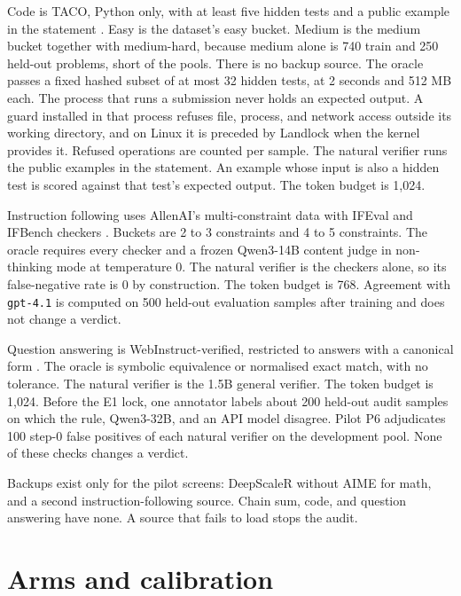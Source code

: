 Code is TACO, Python only, with at least five hidden tests and a public example in the statement \citep{li2023taco}.
Easy is the dataset's easy bucket.
Medium is the medium bucket together with medium-hard, because medium alone is 740 train and 250 held-out problems, short of the pools.
There is no backup source.
The oracle passes a fixed hashed subset of at most 32 hidden tests, at 2 seconds and 512 MB each.
The process that runs a submission never holds an expected output.
A guard installed in that process refuses file, process, and network access outside its working directory, and on Linux it is preceded by Landlock when the kernel provides it.
Refused operations are counted per sample.
The natural verifier runs the public examples in the statement.
An example whose input is also a hidden test is scored against that test's expected output.
The token budget is 1,024.

Instruction following uses AllenAI's multi-constraint data with IFEval and IFBench checkers \citep{pyatkin2025ifbench,lambert2024tulu}.
Buckets are 2 to 3 constraints and 4 to 5 constraints.
The oracle requires every checker and a frozen Qwen3-14B content judge in non-thinking mode at temperature 0.
The natural verifier is the checkers alone, so its false-negative rate is 0 by construction.
The token budget is 768.
Agreement with \texttt{gpt-4.1} is computed on 500 held-out evaluation samples after training and does not change a verdict.

Question answering is WebInstruct-verified, restricted to answers with a canonical form \citep{ma2025reasoner}.
The oracle is symbolic equivalence or normalised exact match, with no tolerance.
The natural verifier is the 1.5B general verifier.
The token budget is 1,024.
Before the E1 lock, one annotator labels about 200 held-out audit samples on which the rule, Qwen3-32B, and an API model disagree.
Pilot P6 adjudicates 100 step-0 false positives of each natural verifier on the development pool.
None of these checks changes a verdict.

Backups exist only for the pilot screens: DeepScaleR without AIME for math, and a second instruction-following source.
Chain sum, code, and question answering have none.
A source that fails to load stops the audit.

\section{Arms and calibration}
\label{app:arms}

